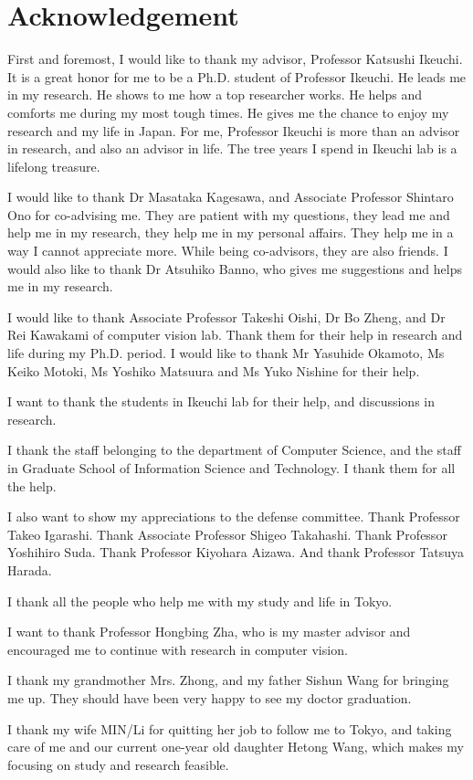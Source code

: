 \cleardoublepage

\chapter*{Acknowledgement}
%
\thispagestyle{empty}%
First and foremost, I would like to thank my advisor, Professor Katsushi Ikeuchi. It is a great honor for me to be a Ph.D. student of Professor Ikeuchi. He leads me in my research. He shows to me how a top researcher works. He helps and comforts me during my most tough times. He gives me the chance to enjoy my research and my life in Japan. For me, Professor Ikeuchi is more than an advisor in research, and also an advisor in life. The tree years I spend in Ikeuchi lab is a lifelong treasure.

I would like to thank Dr Masataka Kagesawa, and Associate Professor Shintaro Ono for co-advising me. They are patient with my questions, they lead me and help me in my research, they help me in my personal affairs. They help me in a way I cannot appreciate more. While being co-advisors, they are also friends. I would also like to thank Dr Atsuhiko Banno, who gives me suggestions and helps me in my research.

I would like to thank Associate Professor Takeshi Oishi, Dr Bo Zheng, and Dr Rei Kawakami of computer vision lab. Thank them for their help in research and life during my Ph.D. period. I would like to thank Mr Yasuhide Okamoto, Ms Keiko Motoki,  Ms Yoshiko Matsuura and Ms Yuko Nishine for their help.

I want to thank the students in Ikeuchi lab for their help, and discussions in research.

I thank the staff belonging to the department of Computer Science, and the staff in Graduate School of Information Science and Technology. I thank them for all the help.


I also want to show my appreciations to the defense  committee. Thank Professor Takeo Igarashi. Thank Associate Professor Shigeo Takahashi. Thank Professor Yoshihiro Suda. Thank  Professor Kiyohara Aizawa. And thank Professor Tatsuya Harada.

I thank all the people who help me with my study and life in Tokyo.

I want to thank Professor Hongbing Zha, who is my master advisor and encouraged me to continue with research in computer vision.

I thank my grandmother Mrs. Zhong, and my father Sishun Wang for bringing me up. They should have been very happy to see my doctor graduation.

I thank my wife MIN/Li for quitting her job to follow me to Tokyo, and taking care of me and our current one-year old daughter Hetong Wang, which makes my focusing on study and research feasible. 
